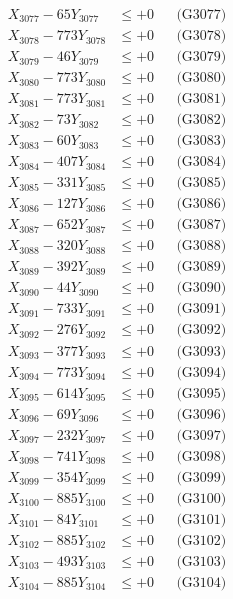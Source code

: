 \documentclass[a4paper,10pt]{article}
\begin{document}
{\begin{align}
X_{3077} - 65Y_{3077} &\leq +0 && \text{(G3077)} \\
X_{3078} - 773Y_{3078} &\leq +0 && \text{(G3078)} \\
X_{3079} - 46Y_{3079} &\leq +0 && \text{(G3079)} \\
X_{3080} - 773Y_{3080} &\leq +0 && \text{(G3080)} \\
\allowbreak
X_{3081} - 773Y_{3081} &\leq +0 && \text{(G3081)} \\
X_{3082} - 73Y_{3082} &\leq +0 && \text{(G3082)} \\
X_{3083} - 60Y_{3083} &\leq +0 && \text{(G3083)} \\
X_{3084} - 407Y_{3084} &\leq +0 && \text{(G3084)} \\
X_{3085} - 331Y_{3085} &\leq +0 && \text{(G3085)} \\
X_{3086} - 127Y_{3086} &\leq +0 && \text{(G3086)} \\
X_{3087} - 652Y_{3087} &\leq +0 && \text{(G3087)} \\
X_{3088} - 320Y_{3088} &\leq +0 && \text{(G3088)} \\
X_{3089} - 392Y_{3089} &\leq +0 && \text{(G3089)} \\
X_{3090} - 44Y_{3090} &\leq +0 && \text{(G3090)} \\
\allowbreak
X_{3091} - 733Y_{3091} &\leq +0 && \text{(G3091)} \\
X_{3092} - 276Y_{3092} &\leq +0 && \text{(G3092)} \\
X_{3093} - 377Y_{3093} &\leq +0 && \text{(G3093)} \\
X_{3094} - 773Y_{3094} &\leq +0 && \text{(G3094)} \\
X_{3095} - 614Y_{3095} &\leq +0 && \text{(G3095)} \\
X_{3096} - 69Y_{3096} &\leq +0 && \text{(G3096)} \\
X_{3097} - 232Y_{3097} &\leq +0 && \text{(G3097)} \\
X_{3098} - 741Y_{3098} &\leq +0 && \text{(G3098)} \\
X_{3099} - 354Y_{3099} &\leq +0 && \text{(G3099)} \\
X_{3100} - 885Y_{3100} &\leq +0 && \text{(G3100)} \\
\allowbreak
X_{3101} - 84Y_{3101} &\leq +0 && \text{(G3101)} \\
X_{3102} - 885Y_{3102} &\leq +0 && \text{(G3102)} \\
X_{3103} - 493Y_{3103} &\leq +0 && \text{(G3103)} \\
X_{3104} - 885Y_{3104} &\leq +0 && \text{(G3104)} \\

\end{align}}
\end{document}

